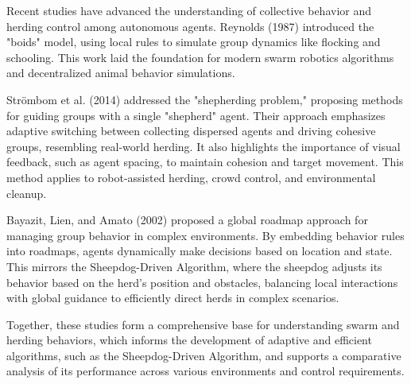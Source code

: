 \documentclass[9pt]{pnas-new}
\begin{document}
Recent studies have advanced the understanding of collective behavior and herding control among autonomous agents. Reynolds (1987) \cite{reynols1987} introduced the "boids" model, using local rules to simulate group dynamics like flocking and schooling. This work laid the foundation for modern swarm robotics algorithms and decentralized animal behavior simulations.

Strömbom et al. (2014) \cite{Strmbom2014SolvingTS} addressed the "shepherding problem," proposing methods for guiding groups with a single "shepherd" agent. Their approach emphasizes adaptive switching between collecting dispersed agents and driving cohesive groups, resembling real-world herding. It also highlights the importance of visual feedback, such as agent spacing, to maintain cohesion and target movement. This method applies to robot-assisted herding, crowd control, and environmental cleanup.

Bayazit, Lien, and Amato (2002) \cite{bayazit2002} proposed a global roadmap approach for managing group behavior in complex environments. By embedding behavior rules into roadmaps, agents dynamically make decisions based on location and state. This mirrors the Sheepdog-Driven Algorithm, where the sheepdog adjusts its behavior based on the herd’s position and obstacles, balancing local interactions with global guidance to efficiently direct herds in complex scenarios.

Together, these studies form a comprehensive base for understanding swarm and herding behaviors, which informs the development of adaptive and efficient algorithms, such as the Sheepdog-Driven Algorithm, and supports a comparative analysis of its performance across various environments and control requirements.
\end{document}
